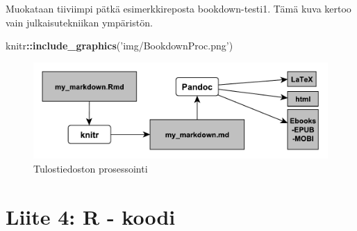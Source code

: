 \documentclass[
  finnish,
]{book}
\newenvironment{Shaded}{\begin{snugshade}}{\end{snugshade}}
\newcommand{\CommentTok}[1]{\textcolor[rgb]{0.56,0.35,0.01}{\textit{#1}}}
\newcommand{\KeywordTok}[1]{\textcolor[rgb]{0.13,0.29,0.53}{\textbf{#1}}}
\newcommand{\NormalTok}[1]{#1}
\newcommand{\OperatorTok}[1]{\textcolor[rgb]{0.81,0.36,0.00}{\textbf{#1}}}
\newcommand{\StringTok}[1]{\textcolor[rgb]{0.31,0.60,0.02}{#1}}
\begin{document}
Muokataan tiiviimpi pätkä esimerkkireposta bookdown-testi1. Tämä kuva kertoo vain
julkaisutekniikan ympäristön.

\begin{Shaded}
\begin{Highlighting}[]
\NormalTok{knitr}\OperatorTok{::}\KeywordTok{include_graphics}\NormalTok{(}\StringTok{'img/BookdownProc.png'}\NormalTok{)}
\end{Highlighting}
\end{Shaded}

\begin{figure}

{\centering \includegraphics[width=0.7\linewidth]{img/BookdownProc} 

}

\caption{Tulostiedoston prosessointi}\label{fig:L3bdprocess1}
\end{figure}

\begin{Shaded}
\end{Shaded}

\hypertarget{liite-4-r---koodi}{%
\section*{Liite 4: R - koodi}\label{liite-4-r---koodi}}
\end{document}
